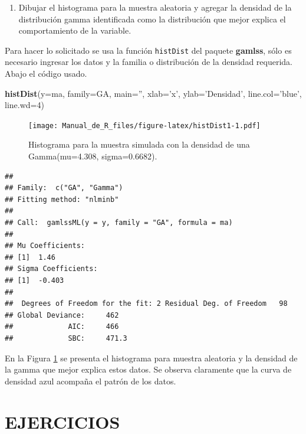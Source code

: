 \documentclass[10pt,]{krantz}
\makeatletter
\newenvironment{Shaded}{\begin{snugshade}}{\end{snugshade}}
\newcommand{\KeywordTok}[1]{\textcolor[rgb]{0.13,0.29,0.53}{\textbf{{#1}}}}
\newcommand{\DataTypeTok}[1]{\textcolor[rgb]{0.13,0.29,0.53}{{#1}}}
\newcommand{\DecValTok}[1]{\textcolor[rgb]{0.00,0.00,0.81}{{#1}}}
\newcommand{\StringTok}[1]{\textcolor[rgb]{0.31,0.60,0.02}{{#1}}}
\newcommand{\NormalTok}[1]{{#1}}
\providecommand{\tightlist}{%
  \setlength{\itemsep}{0pt}\setlength{\parskip}{0pt}}
\newenvironment{kframe}{%
\medskip{}
\setlength{\fboxsep}{.8em}
 \def\at@end@of@kframe{}%
 \ifinner\ifhmode%
  \def\at@end@of@kframe{\end{minipage}}%
  \begin{minipage}{\columnwidth}%
 \fi\fi%
 \def\FrameCommand##1{\hskip\@totalleftmargin \hskip-\fboxsep
 \colorbox{shadecolor}{##1}\hskip-\fboxsep
     \hskip-\linewidth \hskip-\@totalleftmargin \hskip\columnwidth}%
 \MakeFramed {\advance\hsize-\width
   \@totalleftmargin\z@ \linewidth\hsize
   \@setminipage}}%
 {\par\unskip\endMakeFramed%
 \at@end@of@kframe}
\renewenvironment{Shaded}{\begin{kframe}}{\end{kframe}}
\makeatother
\begin{document}
\begin{enumerate}
\def\labelenumi{\arabic{enumi})}
\setcounter{enumi}{2}
\tightlist
\item
  Dibujar el histograma para la muestra aleatoria y agregar la densidad
  de la distribución gamma identificada como la distribución que mejor
  explica el comportamiento de la variable.
\end{enumerate}

Para hacer lo solicitado se usa la función \texttt{histDist} del paquete
\textbf{gamlss}, sólo es necesario ingresar los datos y la familia o
distribución de la densidad requerida. Abajo el código usado.

\begin{Shaded}
\begin{Highlighting}[]
\KeywordTok{histDist}\NormalTok{(}\DataTypeTok{y=}\NormalTok{ma, }\DataTypeTok{family=}\NormalTok{GA, }\DataTypeTok{main=}\StringTok{''}\NormalTok{, }\DataTypeTok{xlab=}\StringTok{'x'}\NormalTok{, }\DataTypeTok{ylab=}\StringTok{'Densidad'}\NormalTok{,}
         \DataTypeTok{line.col=}\StringTok{'blue'}\NormalTok{, }\DataTypeTok{line.wd=}\DecValTok{4}\NormalTok{)}
\end{Highlighting}
\end{Shaded}

\begin{figure}[htbp]
\centering
\texttt{[image: Manual\_de\_R\_files/figure-latex/histDist1-1.pdf]}
\caption{\label{fig:histDist1}Histograma para la muestra simulada con la
densidad de una Gamma(mu=4.308, sigma=0.6682).}
\end{figure}

\begin{verbatim}
## 
## Family:  c("GA", "Gamma") 
## Fitting method: "nlminb" 
## 
## Call:  gamlssML(y = y, family = "GA", formula = ma) 
## 
## Mu Coefficients:
## [1]  1.46
## Sigma Coefficients:
## [1]  -0.403
## 
##  Degrees of Freedom for the fit: 2 Residual Deg. of Freedom   98 
## Global Deviance:     462 
##             AIC:     466 
##             SBC:     471.3
\end{verbatim}

En la Figura \ref{fig:histDist1} se presenta el histograma para muestra
aleatoria y la densidad de la gamma que mejor explica estos datos. Se
observa claramente que la curva de densidad azul acompaña el patrón de
los datos.

\section*{EJERCICIOS}\label{ejercicios-6}
\end{document}

